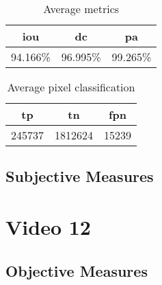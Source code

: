 \begin{minipage}[c]{0.475\textwidth}
\begin{table}[H]
    \centering
    \begin{tabular}{||c c c||} 
        \hline
        \acrshort{iou} & \acrshort{dc} & \acrshort{pa} \\ [0.5ex] 
        \hline\hline
        94.166\% & 96.995\% & 99.265\% \\ [1ex] 
        \hline
    \end{tabular}
    \caption{Average metrics}
    \label{tab:metrics_video_11}
\end{table}
\end{minipage}
\begin{minipage}[c]{0.475\textwidth}
\begin{table}[H]
    \centering
    \begin{tabular}{||c c c||} 
        \hline
        \acrshort{tp} & \acrshort{tn} & \acrshort{fpn} \\ [0.5ex] 
        \hline\hline
        245737 & 1812624 & 15239 \\ [1ex] 
        \hline
    \end{tabular}
    \caption{Average pixel classification}
    \label{tab:pixels_video_11}
\end{table}
\end{minipage}

\subsection{Subjective Measures}



\section{Video 12}
\subsection{Objective Measures}

